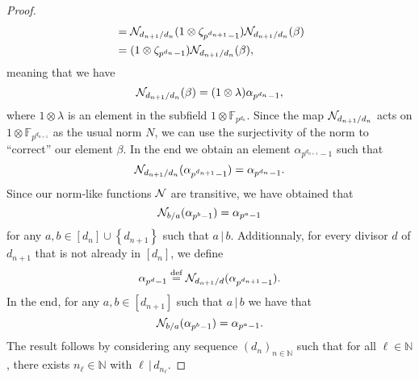 \documentclass[a4paper,11pt]{article}
\begin{document}
\begin{proof}
\begin{align*}
  &= \mathcal N_{d_{n+1}/d_{n}}(1\otimes\zeta_{p^{d_{n+1}}-1}) \mathcal N_{d_{n+1}/d_{n}}(\beta) \\
  &= (1\otimes\zeta_{p^{d_{n}}-1})\mathcal N_{d_{n+1}/d_{n}}(\beta),
\end{align*}
meaning that we have
\[
  \mathcal N_{d_{n+1}/d_{n}}(\beta)=(1\otimes\lambda)\alpha_{p^{d_{n}}-1},
\]
where $1\otimes\lambda$ is an element in the subfield $1\otimes\mathbb{F}_{p^{d_{n}}}$. Since the map
$\mathcal N_{d_{n+1}/d_{n}}$ acts on $1\otimes\mathbb{F}_{p^{d_{n+1}}}$ as the
usual norm $N$, we can use
the surjectivity of the norm to ``correct'' our element $\beta$. In the end we
obtain an element $\alpha_{p^{d_{n+1}}-1}$ such
that
\[
  \mathcal N_{d_{n+1}/d_{n}}(\alpha_{p^{d_{n+1}}-1})=
  \alpha_{p^{d_{n}}-1}.
\]
Since our norm-like functions $\mathcal N$ are transitive, we have obtained that 
\[
  \mathcal N_{b/a}(\alpha_{p^b-1})=\alpha_{p^a-1}
\]
for any $a,b\in \left[ d_n \right]\cup\left\{ d_{n+1} \right\}$ such that
$a\,|\,b$. Additionnaly, for every divisor $d$ of $d_{n+1}$ that is not already in $\left[
d_n \right]$, we define
\[
  \alpha_{p^d-1}\overset{\text{def}}{=}\mathcal N_{d_{n+1}/d}(\alpha_{p^{d_{n+1}}-1}).
\]
In the end, for any $a, b\in\left[ d_{n+1} \right]$ such that
$a\,|\,b$ we have that
\[
  \mathcal N_{b/a}(\alpha_{p^b-1})=\alpha_{p^a-1}.
\]
The result follows by considering any sequence $(d_n)_{n\in\mathbb{N}}$ such
that for all $\ell\in\mathbb{N}$, there exists $n_\ell\in\mathbb{N}$ with
$\ell\,|\,d_{n_\ell}$. 
\end{proof}
\end{document}
